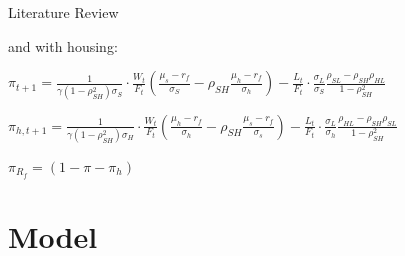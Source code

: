 \documentclass{beamer}
\begin{document}
\begin{frame}[allowframebreaks]{Literature Review}
\begin{itemize}
	and with housing:

\begin{center}
	$\pi_{t+1} = \frac{1}{\gamma (1 - \rho^2_{SH}) \sigma_S} \cdot \frac{W_t}{F_t} \left( \frac{\mu_s - r_f}{\sigma_S} - \rho_{SH} \frac{\mu_h - r_f}{\sigma_h} \right) - \frac{L_t}{F_t} \cdot \frac{\sigma_L}{\sigma_S} \frac{\rho_{SL} - \rho_{SH}\rho_{HL}}{1 - \rho^2_{SH}}$
\end{center}
\begin{center}
	$\pi_{h,t+1} = \frac{1}{\gamma (1 - \rho^2_{SH}) \sigma_H} \cdot \frac{W_t}{F_t} \left( \frac{\mu_h - r_f}{\sigma_h} - \rho_{SH} \frac{\mu_s - r_f}{\sigma_s} \right) - \frac{L_t}{F_t} \cdot \frac{\sigma_L}{\sigma_h} \frac{\rho_{HL} - \rho_{SH}\rho_{SL}}{1 - \rho^2_{SH}}$
\end{center}
\begin{center}
	$\pi_{R_f} = \left( 1 - \pi - \pi_h \right)$
\end{center}

  \end{itemize}
\end{frame}

\section{Model}
\end{document}

